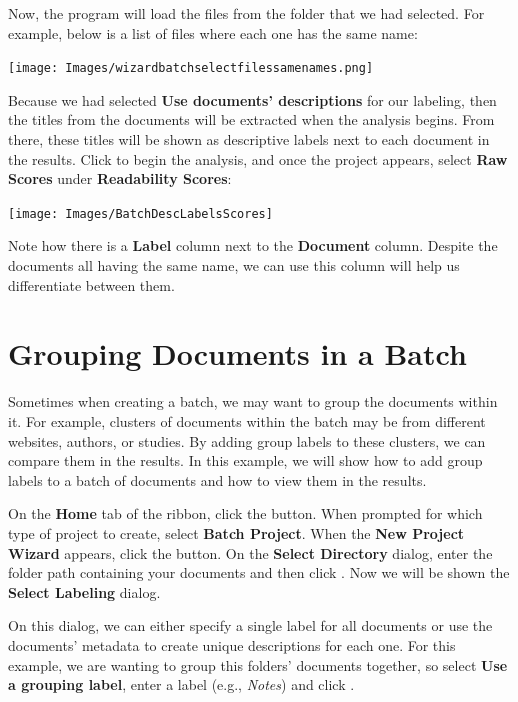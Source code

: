 \documentclass[
]{book}
\theoremstyle{definition}
\theoremstyle{definition}
\theoremstyle{definition}
\theoremstyle{definition}
\theoremstyle{remark}
\begin{document}
Now, the program will load the files from the folder that we had selected. For example, below is a list of files where each one has the same name:

\texttt{[image: Images/wizardbatchselectfilessamenames.png]}

Because we had selected \textbf{Use documents' descriptions} for our labeling, then the titles from the documents will be extracted when the analysis begins. From there, these titles will be shown as descriptive labels next to each document in the results. Click  to begin the analysis, and once the project appears, select \textbf{Raw Scores} under \textbf{Readability Scores}:

\begin{center}\texttt{[image: Images/BatchDescLabelsScores]} \end{center}

Note how there is a \textbf{Label} column next to the \textbf{Document} column. Despite the documents all having the same name, we can use this column will help us differentiate between them.

\newpage

\hypertarget{grouping-documents-in-a-batch}{%
\section{Grouping Documents in a Batch}\label{grouping-documents-in-a-batch}}

Sometimes when creating a batch, we may want to group the documents within it. For example, clusters of documents within the batch may be from different websites, authors, or studies. By adding group labels to these clusters, we can compare them in the results. In this example, we will show how to add group labels to a batch of documents and how to view them in the results.

On the \textbf{Home} tab of the ribbon, click the  button. When prompted for which type of project to create, select \textbf{Batch Project}. When the \textbf{New Project Wizard} appears, click the  button. On the \textbf{Select Directory} dialog, enter the folder path containing your documents and then click . Now we will be shown the \textbf{Select Labeling} dialog.

On this dialog, we can either specify a single label for all documents or use the documents' metadata to create unique descriptions for each one. For this example, we are wanting to group this folders' documents together, so select \textbf{Use a grouping label}, enter a label (e.g., \emph{Notes}) and click .
\end{document}
